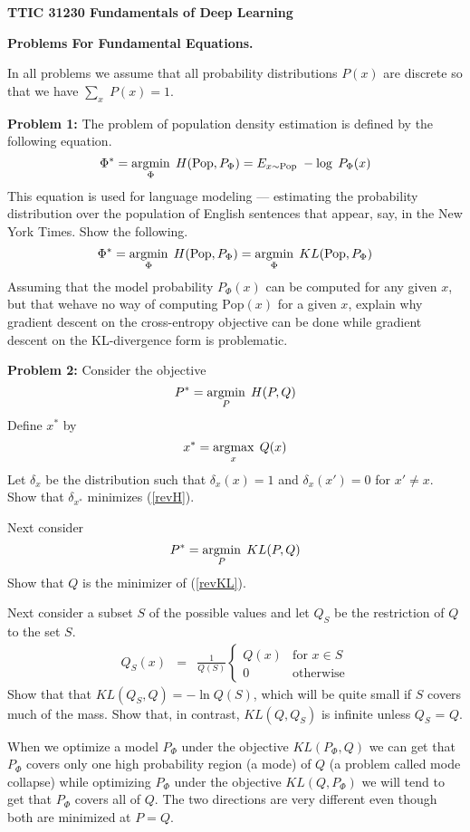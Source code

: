 \documentclass{article}
\begin{document}
\centerline{\bf TTIC 31230 Fundamentals of Deep Learning}
\centerline{\bf Problems For Fundamental Equations.}

\bigskip
\bigskip
In all problems we assume that all probability distributions $P(x)$ are discrete so that we have $\sum_x\;P(x) = 1$.

\bigskip
{\bf Problem 1:} The problem of population density estimation is defined by the following equation.
$$\Phi^* = \operatorname*{argmin}_\Phi\;H(\mathrm{Pop},P_\Phi) = E_{x \sim \mathrm{Pop}}\;-\log\;P_\Phi(x)$$
This equation is used for language modeling --- estimating the probability distribution over the population of English sentences that appear, say, in the New York Times.
Show the following.
$$\Phi^* = \operatorname*{argmin}_\Phi\;H(\mathrm{Pop},P_\Phi) = \operatorname*{argmin}_\Phi \;KL(\mathrm{Pop},P_\Phi)$$
Assuming that the model probability $P_\Phi(x)$ can be computed for any given $x$, but that wehave no way of computing $\mathrm{Pop}(x)$ for a given $x$,
explain why gradient descent on the cross-entropy objective
can be done while gradient descent on the KL-divergence form is problematic.


\bigskip
{\bf Problem 2:} Consider the objective
\begin{equation}
  \label{revH}
  P^* = \operatorname*{argmin}_P\;H(P,Q)
\end{equation}
Define $x^*$ by
$$x^* = \operatorname*{argmax}_x\;Q(x)$$
Let $\delta_x$ be the distribution such that $\delta_x(x) = 1$ and $\delta_x(x') = 0$ for $x' \not = x$.
Show that $\delta_{x^*}$ minimizes (\ref{revH}).

Next consider
\begin{equation}
  \label{revKL}
  P^* = \operatorname*{argmin}_P\;KL(P,Q)
\end{equation}
Show that $Q$ is the minimizer of (\ref{revKL}).

Next consider a subset $S$ of the possible values and let $Q_S$ be the restriction of $Q$ to the set $S$.
\begin{eqnarray*}
  Q_S(x) & = & \frac{1}{Q(S)}\left\{\begin{array}{ll} Q(x) & \mbox{for $x \in S$} \\ 0 & \mbox{otherwise} \end{array}\right.
\end{eqnarray*}
Show that that $KL(Q_S,Q) = -\ln Q(S)$, which will be quite small if $S$ covers much of the mass. Show that, in contrast, $KL(Q,Q_S)$ is infinite unless
$Q_S$ = $Q$.

When we optimize a model $P_\Phi$ under the objective $KL(P_\Phi,Q)$ we can get that $P_\Phi$ covers only one high probability region (a mode) of $Q$ (a problem called mode collapse)
while optimizing $P_\Phi$ under the objective $KL(Q,P_\Phi)$ we will tend to get that $P_\Phi$ covers all of $Q$.  The two directions are very different even though both
are minimized at $P = Q$.
\end{document}
